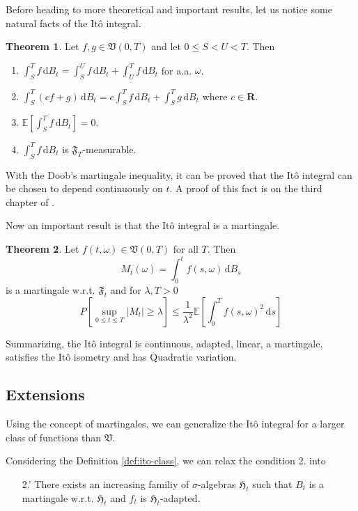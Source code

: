 \documentclass[12pt,a4paper]{article}
\theoremstyle{definition}
\newtheorem{theorem}{Theorem}[section]
\begin{document}
Before heading to more theoretical and important results, let us notice some natural facts of the Itô integral.

\begin{theorem}
	Let $f, g \in \mathfrak{V}(0,T)$ and let $0 \leq S < U < T$. Then
	\begin{enumerate}
		\item $\int_S^T f \, \mathrm{d}B_t = \int_S^U f \, \mathrm{d}B_t + \int_U^T f \, \mathrm{d}B_t$ for a.a. $\omega$.
		\item $\int_S^T (cf + g) \, \mathrm{d}B_t = c \int_S^T f \, \mathrm{d}B_t + \int_S^T g \, \mathrm{d}B_t$ where $c \in \textbf{R}$.
		\item $\mathbb{E} \left[ \int_S^T f \, \mathrm{d}B_t \right] = 0$.
		\item $\int_S^T f \, \mathrm{d}B_t$ is $\mathfrak{F}_T$-measurable.
	\end{enumerate}
\end{theorem}

With the Doob's martingale inequality, it can be proved that the Itô integral can be chosen to depend continuously on $t$. A proof of this fact is on the third chapter of \cite{oksendal2013stochastic}.

Now an important result is that the Itô integral is a martingale.

\begin{theorem}
	Let $f(t, \omega) \in \mathfrak{V}(0,T)$ for all $T$. Then
	\[
		M_t(\omega)  = \int_0^t f(s,\omega)\, \mathrm{d}B_s
	\]
	is a martingale w.r.t. $\mathfrak{F}_t$ and for $\lambda, T > 0$
	\[
		P \left[ \sup_{0 \leq t \leq T} |M_t| \geq \lambda \right] \leq \frac{1}{\lambda^2} \mathbb{E} \left[ \int_0^T f(s,\omega)^2 \, \mathrm{d}s \right]
	\]
\end{theorem}

Summarizing, the Itô integral is continuous, adapted, linear, a martingale, satisfies the Itô isometry and has Quadratic variation.

\subsection{Extensions}

Using the concept of martingales, we can generalize the Itô integral for a larger class of functions than $\mathfrak{V}$.

Considering the Definition \ref{def:ito-class}, we can relax the condition 2. into
\begin{itemize}
	\item[2.'] There exists an increasing familiy of $\sigma$-algebras $\mathfrak{H}_t$ such that $B_t$ is a martingale w.r.t. $\mathfrak{H}_t$ and $f_t$ is $\mathfrak{H}_t$-adapted.
\end{itemize}
\end{document}
